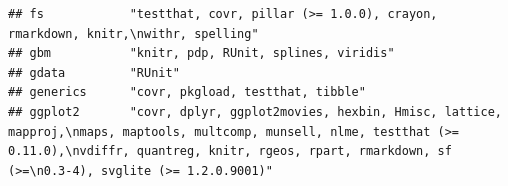 \documentclass[]{article}
\begin{document}
\begin{verbatim}
## fs            "testthat, covr, pillar (>= 1.0.0), crayon, rmarkdown, knitr,\nwithr, spelling"                                                                                                                                                                                                                                                                                                                                                                                                                                                                                                           
## gbm           "knitr, pdp, RUnit, splines, viridis"                                                                                                                                                                                                                                                                                                                                                                                                                                                                                                                                                     
## gdata         "RUnit"                                                                                                                                                                                                                                                                                                                                                                                                                                                                                                                                                                                   
## generics      "covr, pkgload, testthat, tibble"                                                                                                                                                                                                                                                                                                                                                                                                                                                                                                                                                         
## ggplot2       "covr, dplyr, ggplot2movies, hexbin, Hmisc, lattice, mapproj,\nmaps, maptools, multcomp, munsell, nlme, testthat (>= 0.11.0),\nvdiffr, quantreg, knitr, rgeos, rpart, rmarkdown, sf (>=\n0.3-4), svglite (>= 1.2.0.9001)"                                                                                                                                                                                                                                                                                                                                                                 

\end{verbatim}
\end{document}
